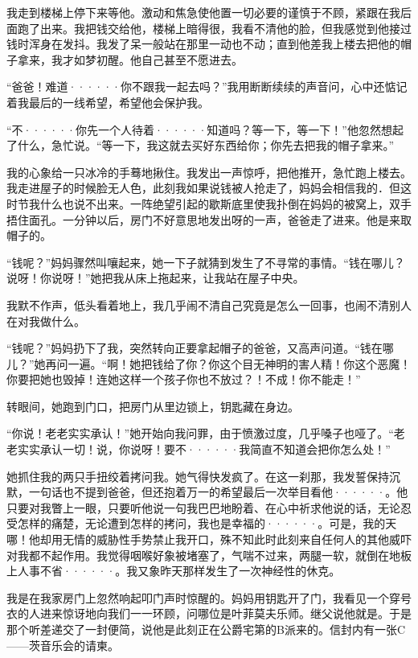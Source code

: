 \documentclass[12pt, UTF8]{ctexbook}
\begin{document}
\par 我走到楼梯上停下来等他。激动和焦急使他置一切必要的谨慎于不顾，紧跟在我后面跑了出来。我把钱交给他，楼梯上暗得很，我看不清他的脸，但我感觉到他接过钱时浑身在发抖。我发了呆一般站在那里一动也不动；直到他差我上楼去把他的帽子拿来，我才如梦初醒。他自己甚至不愿进去。
\par “爸爸！难道······你不跟我一起去吗？”我用断断续续的声音问，心中还惦记着我最后的一线希望，希望他会保护我。
\par “不······你先一个人待着······知道吗？等一下，等一下！”他忽然想起了什么，急忙说。“等一下，我这就去买好东西给你；你先去把我的帽子拿来。”
\par 我的心象给一只冰冷的手蓦地揪住。我发出一声惊呼，把他推开，急忙跑上楼去。我走进屋子的时候脸无人色，此刻我如果说钱被人抢走了，妈妈会相信我的．但这时节我什么也说不出来。一阵绝望引起的歇斯底里使我扑倒在妈妈的被窝上，双手捂住面孔。一分钟以后，房门不好意思地发出呀的一声，爸爸走了进来。他是来取帽子的。
\par “钱呢？”妈妈骤然叫嚷起来，她一下子就猜到发生了不寻常的事情。“钱在哪儿？说呀！你说呀！”她把我从床上拖起来，让我站在屋子中央。
\par 我默不作声，低头看着地上，我几乎闹不清自己究竟是怎么一回事，也闹不清别人在对我做什么。
\par “钱呢？”妈妈扔下了我，突然转向正要拿起帽子的爸爸，又高声问道。“钱在哪儿？”她再问一遍。“啊！她把钱给了你？你这个目无神明的害人精！你这个恶魔！你要把她也毁掉！连她这样一个孩子你也不放过？！不成！你不能走！”
\par 转眼间，她跑到门口，把房门从里边锁上，钥匙藏在身边。
\par “你说！老老实实承认！”她开始向我问罪，由于愤激过度，几乎嗓子也哑了。“老老实实承认一切！说，你说呀！要不······我简直不知道会把你怎么处！”
\par 她抓住我的两只手扭绞着拷问我。她气得快发疯了。在这一刹那，我发誓保持沉默，一句话也不提到爸爸，但还抱着万一的希望最后一次举目看他······。他只要对我瞥上一眼，只要听他说一句我巴巴地盼着、在心中祈求他说的话，无论忍受怎样的痛楚，无论遭到怎样的拷问，我也是幸福的······。可是，我的天哪！他却用无情的威胁性手势禁止我开口，殊不知此时此刻来自任何人的其他威吓对我都不起作用。我觉得咽喉好象被堵塞了，气喘不过来，两腿一软，就倒在地板上人事不省······。我又象昨天那样发生了一次神经性的休克。
\par 我是在我家房门上忽然响起叩门声时惊醒的。妈妈用钥匙开了门，我看见一个穿号衣的人进来惊讶地向我们一一环顾，问哪位是叶菲莫夫乐师。继父说他就是。于是那个听差递交了一封便简，说他是此刻正在公爵宅第的B派来的。信封内有一张C——茨音乐会的请柬。
\end{document}
